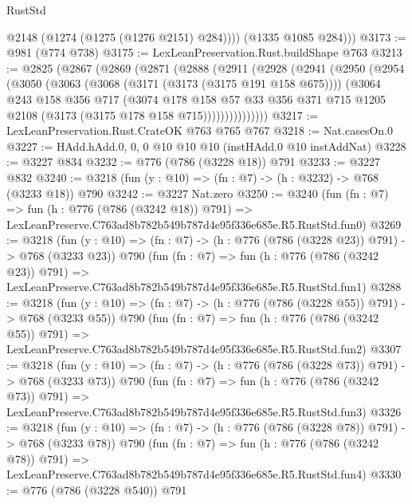 \begin{lexlean}{RustStd}
\begin{coremodule}
            @2148
            (@1274 (@1275 (@1276 @2151) @284))))
        (@1335 @1085 @284)))
@3173 := @981 (@774 @738)
@3175 := LexLeanPreservation.Rust.buildShape @763
@3213 := @2825
    (@2867
      (@2869
        (@2871
          (@2888
            (@2911
              (@2928
                (@2941
                  (@2950
                    (@2954
                      (@3050
                        (@3063
                          (@3068 (@3171 (@3173 (@3175 @191 @158 @675))))
                          (@3064
                            @243
                            @158
                            @356
                            @717
                            (@3074
                              @178
                              @158
                              @57
                              @33
                              @356
                              @371
                              @715
                              @1205
                              @2108
                              (@3173 (@3175 @178 @158 @715)))))))))))))))
@3217 := LexLeanPreservation.Rust.CrateOK @763 @765 @767
@3218 := Nat.casesOn.{0}
@3227 := HAdd.hAdd.{0, 0, 0} @10 @10 @10 (instHAdd.{0} @10 instAddNat)
@3228 := @3227 @834
@3232 := @776 (@786 (@3228 @18)) @791
@3233 := @3227 @832
@3240 := @3218 (fun (y : @10) => (fn : @7) -> (h : @3232) -> @768 (@3233 @18)) @790
@3242 := @3227 Nat.zero
@3250 := @3240
    (fun (fn : @7) =>
    fun (h : @776 (@786 (@3242 @18)) @791) =>
    LexLeanPreserve.C763ad8b782b549b787d4e95f336e685e.R5.RustStd.fun0)
@3269 := @3218
    (fun (y : @10) => (fn : @7) -> (h : @776 (@786 (@3228 @23)) @791) -> @768 (@3233 @23))
    @790
    (fun (fn : @7) =>
    fun (h : @776 (@786 (@3242 @23)) @791) =>
    LexLeanPreserve.C763ad8b782b549b787d4e95f336e685e.R5.RustStd.fun1)
@3288 := @3218
    (fun (y : @10) => (fn : @7) -> (h : @776 (@786 (@3228 @55)) @791) -> @768 (@3233 @55))
    @790
    (fun (fn : @7) =>
    fun (h : @776 (@786 (@3242 @55)) @791) =>
    LexLeanPreserve.C763ad8b782b549b787d4e95f336e685e.R5.RustStd.fun2)
@3307 := @3218
    (fun (y : @10) => (fn : @7) -> (h : @776 (@786 (@3228 @73)) @791) -> @768 (@3233 @73))
    @790
    (fun (fn : @7) =>
    fun (h : @776 (@786 (@3242 @73)) @791) =>
    LexLeanPreserve.C763ad8b782b549b787d4e95f336e685e.R5.RustStd.fun3)
@3326 := @3218
    (fun (y : @10) => (fn : @7) -> (h : @776 (@786 (@3228 @78)) @791) -> @768 (@3233 @78))
    @790
    (fun (fn : @7) =>
    fun (h : @776 (@786 (@3242 @78)) @791) =>
    LexLeanPreserve.C763ad8b782b549b787d4e95f336e685e.R5.RustStd.fun4)
@3330 := @776 (@786 (@3228 @540)) @791

\end{coremodule}
\end{lexlean}
